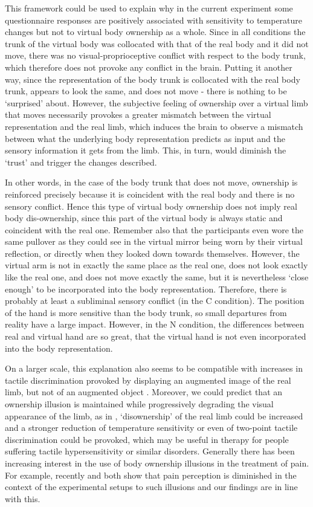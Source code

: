 \documentclass[
		twoside,openright,titlepage,numbers=noenddot,manychapters,
		headinclude,%
                footinclude=false,cleardoublepage=empty,
                BCOR=5mm,
		fontsize=11pt, %
                 enabledeprecatedfontcommands]{scrreprt}
\begin{document}
This framework could be used to explain why in the current experiment some questionnaire responses are positively associated with sensitivity to temperature changes but not to virtual body ownership as a whole. Since in all conditions the trunk of the virtual body was collocated with that of the real body and it did not move, there was no visual-proprioceptive conflict with respect to the body trunk, which therefore does not provoke any conflict in the brain. Putting it another way, since the representation of the body trunk is collocated with the real body trunk, appears to look the same, and does not move - there is nothing to be ‘surprised’ about. However, the subjective feeling of ownership over a virtual limb that moves necessarily provokes a greater mismatch between the virtual representation and the real limb, which induces the brain to observe a mismatch between what the underlying body representation predicts as input and the sensory information it gets from the limb. This, in turn, would diminish the ‘trust’ and trigger the changes described. 

In other words, in the case of the body trunk that does not move, ownership is reinforced precisely because it is coincident with the real body and there is no sensory conflict. Hence this type of virtual body ownership does not imply real body dis-ownership, since this part of the virtual body is always static and coincident with the real one. Remember also that the participants even wore the same pullover as they could see in the virtual mirror being worn by their virtual reflection, or directly when they looked down towards themselves. However, the virtual arm is not in exactly the same place as the real one, does not look exactly like the real one,  and does not move exactly the same,  but it is nevertheless ‘close enough’ to be incorporated into the body representation. Therefore, there is probably at least a subliminal sensory conflict (in the C condition). The position of the hand is more sensitive than the body trunk, so small departures from reality have a large impact. However, in the N condition, the differences between real and virtual hand are so great, that the virtual hand is not even incorporated into the body representation.

On a larger scale, this explanation also seems to be compatible with increases in tactile discrimination provoked by displaying an augmented image of the real limb, but not of an augmented object \cite[]{Kennett2001}. Moreover, we could predict that an ownership illusion is maintained while progressively degrading the visual appearance of the limb, as in \cite[]{Hohwy2010},  ‘disownership’ of the real limb could be increased and a stronger reduction of temperature sensitivity or even of two-point tactile discrimination could be provoked, which may be useful in therapy for people suffering tactile hypersensitivity or similar disorders. Generally there has been increasing interest in the use of body ownership illusions in the treatment of pain.  For example, recently \cite{Hansel2011} and \cite{Longo2009} both show that pain perception is diminished in the context of the experimental setups to such illusions and our findings are in line with this. 
\end{document}
